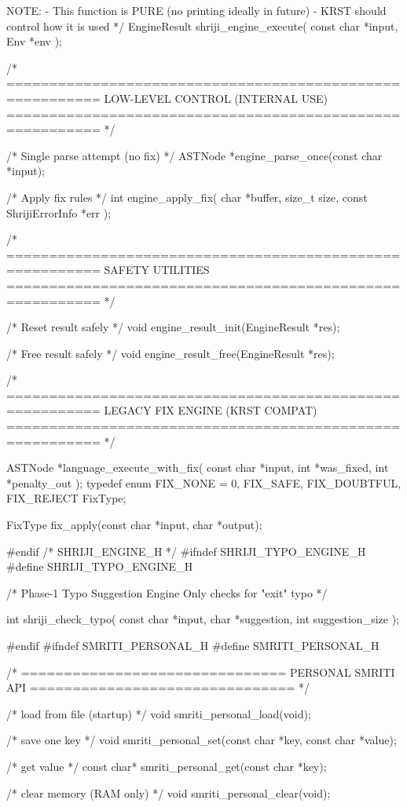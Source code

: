 \documentclass{article}
\begin{document}
   NOTE:
   - This function is PURE (no printing ideally in future)
   - KRST should control how it is used
*/
EngineResult shriji_engine_execute(
    const char *input,
    Env *env
);

/* =========================================================
   LOW-LEVEL CONTROL (INTERNAL USE)
   ========================================================= */

/* Single parse attempt (no fix) */
ASTNode *engine_parse_once(const char *input);

/* Apply fix rules */
int engine_apply_fix(
    char *buffer,
    size_t size,
    const ShrijiErrorInfo *err
);

/* =========================================================
   SAFETY UTILITIES
   ========================================================= */

/* Reset result safely */
void engine_result_init(EngineResult *res);

/* Free result safely */
void engine_result_free(EngineResult *res);

/* =========================================================
   LEGACY FIX ENGINE (KRST COMPAT)
   ========================================================= */

ASTNode *language_execute_with_fix(
    const char *input,
    int *was_fixed,
    int *penalty_out
);
typedef enum {
    FIX_NONE = 0,
    FIX_SAFE,
    FIX_DOUBTFUL,
    FIX_REJECT
} FixType;

FixType fix_apply(const char *input, char *output);

#endif /* SHRIJI_ENGINE_H */
#ifndef SHRIJI_TYPO_ENGINE_H
#define SHRIJI_TYPO_ENGINE_H

/*
    Phase-1 Typo Suggestion Engine
    Only checks for "exit" typo
*/

int shriji_check_typo(
    const char *input,
    char *suggestion,
    int suggestion_size
);

#endif
#ifndef SMRITI_PERSONAL_H
#define SMRITI_PERSONAL_H

/* ===============================
   PERSONAL SMRITI API
   =============================== */

/* load from file (startup) */
void smriti_personal_load(void);

/* save one key */
void smriti_personal_set(const char *key, const char *value);

/* get value */
const char* smriti_personal_get(const char *key);

/* clear memory (RAM only) */
void smriti_personal_clear(void);
\end{document}
